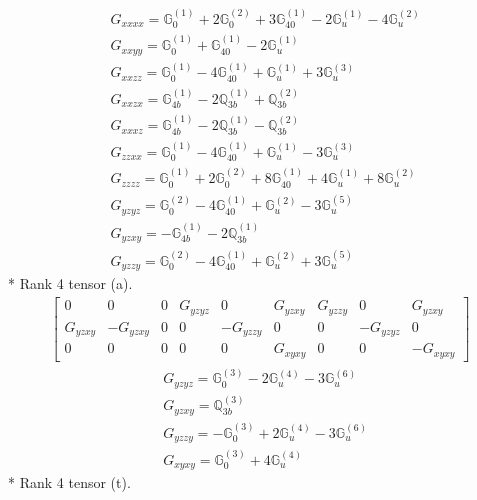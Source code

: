 \documentclass[fleqn,8pt,landscape]{jsarticle}
\begin{document}
\begin{align*}
& G_{xxxx} = \mathbb{G}_{0}^{(1)} + 2 \mathbb{G}_{0}^{(2)} + 3 \mathbb{G}_{40}^{(1)} - 2 \mathbb{G}_{u}^{(1)} - 4 \mathbb{G}_{u}^{(2)} \\
& G_{xxyy} = \mathbb{G}_{0}^{(1)} + \mathbb{G}_{40}^{(1)} - 2 \mathbb{G}_{u}^{(1)} \\
& G_{xxzz} = \mathbb{G}_{0}^{(1)} - 4 \mathbb{G}_{40}^{(1)} + \mathbb{G}_{u}^{(1)} + 3 \mathbb{G}_{u}^{(3)} \\
& G_{xxzx} = \mathbb{G}_{4b}^{(1)} - 2 \mathbb{Q}_{3b}^{(1)} + \mathbb{Q}_{3b}^{(2)} \\
& G_{xxxz} = \mathbb{G}_{4b}^{(1)} - 2 \mathbb{Q}_{3b}^{(1)} - \mathbb{Q}_{3b}^{(2)} \\
& G_{zzxx} = \mathbb{G}_{0}^{(1)} - 4 \mathbb{G}_{40}^{(1)} + \mathbb{G}_{u}^{(1)} - 3 \mathbb{G}_{u}^{(3)} \\
& G_{zzzz} = \mathbb{G}_{0}^{(1)} + 2 \mathbb{G}_{0}^{(2)} + 8 \mathbb{G}_{40}^{(1)} + 4 \mathbb{G}_{u}^{(1)} + 8 \mathbb{G}_{u}^{(2)} \\
& G_{yzyz} = \mathbb{G}_{0}^{(2)} - 4 \mathbb{G}_{40}^{(1)} + \mathbb{G}_{u}^{(2)} - 3 \mathbb{G}_{u}^{(5)} \\
& G_{yzxy} = - \mathbb{G}_{4b}^{(1)} - 2 \mathbb{Q}_{3b}^{(1)} \\
& G_{yzzy} = \mathbb{G}_{0}^{(2)} - 4 \mathbb{G}_{40}^{(1)} + \mathbb{G}_{u}^{(2)} + 3 \mathbb{G}_{u}^{(5)}
\end{align*}
* Rank 4 tensor (a).
\begin{align*}
\begin{bmatrix} 0 & 0 & 0 & G_{yzyz} & 0 & G_{yzxy} & G_{yzzy} & 0 & G_{yzxy} \\ G_{yzxy} & - G_{yzxy} & 0 & 0 & - G_{yzzy} & 0 & 0 & - G_{yzyz} & 0 \\ 0 & 0 & 0 & 0 & 0 & G_{xyxy} & 0 & 0 & - G_{xyxy} \end{bmatrix}
\end{align*}
\begin{align*}
& G_{yzyz} = \mathbb{G}_{0}^{(3)} - 2 \mathbb{G}_{u}^{(4)} - 3 \mathbb{G}_{u}^{(6)} \\
& G_{yzxy} = \mathbb{Q}_{3b}^{(3)} \\
& G_{yzzy} = - \mathbb{G}_{0}^{(3)} + 2 \mathbb{G}_{u}^{(4)} - 3 \mathbb{G}_{u}^{(6)} \\
& G_{xyxy} = \mathbb{G}_{0}^{(3)} + 4 \mathbb{G}_{u}^{(4)}
\end{align*}
* Rank 4 tensor (t).
\end{document}
